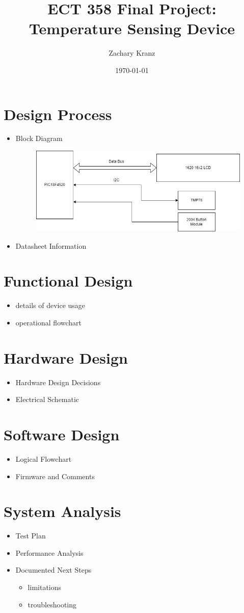 \documentclass[12pt]{article}
\title{ECT 358 Final Project: Temperature Sensing Device}
\date{\today}
\author{Zachary Kranz}
\begin{document}
\maketitle

\section{Design Process}
\begin{itemize}
	\item Block Diagram
	\begin{figure}[H]
	\centering
	\includegraphics[width=4.5in]{connection_diagram}
	\end{figure}
	
	\item Datasheet Information
\end{itemize}

\section{Functional Design}
\begin{itemize}
	\item details of device usage
	\item operational flowchart
\end{itemize}

\section{Hardware Design}
\begin{itemize}
	\item Hardware Design Decisions
	\item Electrical Schematic
\end{itemize}

\section{Software Design}
\begin{itemize}
	\item Logical Flowchart
	\item Firmware and Comments
\end{itemize}

\section{System Analysis}
\begin{itemize}
	\item Test Plan
	\item Performance Analysis
	\item Documented Next Steps
		\begin{itemize}
			\item limitations
			\item troubleshooting
		\end{itemize}
\end{itemize}
\end{document}
